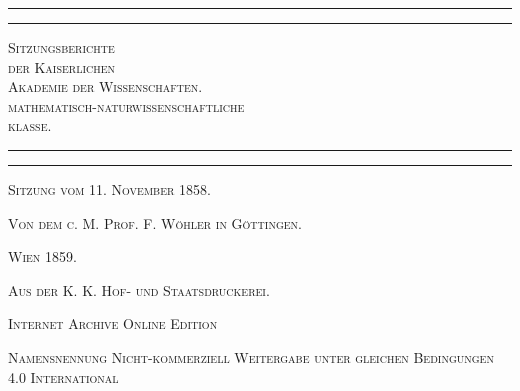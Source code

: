\documentclass[a4paper, 11pt, oneside]{article}
\begin{document}
\begin{titlepage} %
	\centering %

	
	\rule{\textwidth}{1.6pt}\vspace*{-\baselineskip}\vspace*{2pt} %
	\rule{\textwidth}{0.4pt} %
	
	\vspace{1\baselineskip} %
	
	{\scshape\LARGE Sitzungsberichte\\[1.25pt] der Kaiserlichen\\[1.25pt] Akademie der Wissenschaften.\\[1.25pt] mathematisch-naturwissenschaftliche\\[1.25pt] klasse.\\[1.25pt]}
	
	\vspace{1\baselineskip} %

	\rule{\textwidth}{0.4pt}\vspace*{-\baselineskip}\vspace{3.2pt} %
	\rule{\textwidth}{1.6pt} %
	
	\vspace{1\baselineskip} %
	
	
	{\scshape Sitzung vom 11. November 1858.} %
	
	\vspace*{1\baselineskip} %
	
    {\scshape\small Von dem c. M. Prof. F. Wöhler in Göttingen.} %
    
    \vspace*{\fill}

	\vspace{1\baselineskip}

	{\small\scshape Wien 1859.}
	
	{\small\scshape{Aus der K. K. Hof- und Staatsdruckerei.}}
	
	\vspace{0.5\baselineskip} %

    \scshape Internet Archive Online Edition  %
	
	{\scshape\small Namensnennung Nicht-kommerziell Weitergabe unter gleichen Bedingungen 4.0 International} %
\end{titlepage}
\setlength{\parskip}{1mm plus1mm minus1mm}
\clearpage
\tableofcontents
\clearpage
\end{document}
